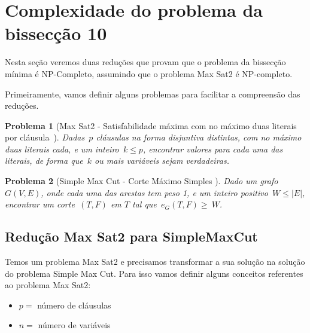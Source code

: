 \documentclass[a4paper,12pt]{article}
\newtheorem{prob}{Problema}
\begin{document}
\newpage
\section {Complexidade do problema da bissecção 10}
	Nesta seção veremos duas reduções que provam que o problema 
	da bissecção mínima é NP-Completo, assumindo
	que o problema Max Sat2 é NP-completo.

	Primeiramente, vamos definir alguns problemas para facilitar
	a compreensão das reduções.

	\medskip

	\begin{prob}[Max Sat2 - Satisfabilidade máxima com no máximo 
	duas literais por cláusula{~\cite{GareyJS76}}]
		Dadas~$p$ cláusulas na forma disjuntiva distintas, com no máximo
		duas literais cada, e um inteiro~$k\le p$,
		encontrar valores para cada uma das literais, de forma
		que~$k$ ou mais variáveis sejam verdadeiras.

	\end{prob}

	\medskip

	\begin{prob}[Simple Max Cut - Corte Máximo Simples 
]
		Dado um grafo~$G(V,E)$, onde cada uma das arestas tem 
		peso 1, e um inteiro positivo~$W\le|E|$, encontrar um
		corte~$(T,F)$ em $T$ tal 
		que~$e_G(T,F)\ge~W$.
		
	\end{prob}

	

		

	\bigskip
	\bigskip
	\bigskip

	\subsection{Redução Max Sat2 para SimpleMaxCut}

		Temos um problema Max Sat2 e precisamos transformar
		a sua solução na solução do problema Simple Max Cut.
		Para isso vamos definir alguns conceitos referentes
		ao problema Max Sat2:
		\begin{itemize}
			\item $p = $ número de cláusulas
			\item $n = $ número de variáveis
		\end{itemize}
\end{document}
